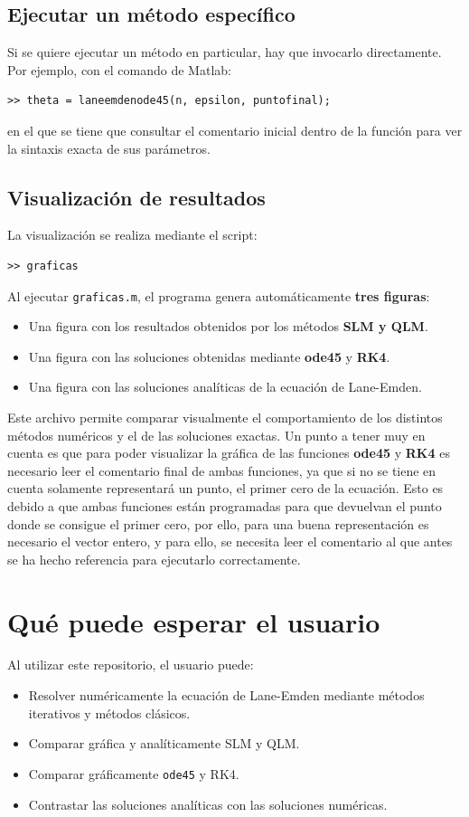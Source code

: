 \documentclass{article}
\begin{document}
\subsection{Ejecutar un método específico}

Si se quiere ejecutar un método en particular, hay que invocarlo directamente. 
Por ejemplo, con el comando de Matlab:
\begin{verbatim}
>> theta = laneemdenode45(n, epsilon, puntofinal);
\end{verbatim}
en el que se tiene que consultar el comentario inicial 
dentro de la función para ver la sintaxis exacta de sus parámetros.

\subsection{Visualización de resultados}

La visualización se realiza mediante el script:
\begin{verbatim}
>> graficas
\end{verbatim}
Al ejecutar \texttt{graficas.m}, el programa genera automáticamente 
\textbf{tres figuras}:
\begin{itemize}
  \item Una figura con los resultados obtenidos por los métodos \textbf{SLM y QLM}.
  \item Una figura con las soluciones obtenidas mediante \textbf{ode45} y \textbf{RK4}.
  \item Una figura con las soluciones analíticas de la ecuación de Lane-Emden.
\end{itemize}
Este archivo permite comparar visualmente el comportamiento de los distintos 
métodos numéricos y el de las soluciones exactas.
Un punto a tener muy en cuenta es que para poder visualizar la gráfica
de las funciones \textbf{ode45} y \textbf{RK4} es necesario leer el
comentario final de ambas funciones, ya que si no se tiene en cuenta
solamente representará un punto, el primer cero de la ecuación. Esto
es debido a que ambas funciones están programadas para que devuelvan
el punto donde se consigue el primer cero, por ello, para una buena 
representación es necesario el vector entero, y para ello, se necesita 
leer el comentario al que antes se ha hecho referencia para ejecutarlo
correctamente.

\section{Qué puede esperar el usuario}

Al utilizar este repositorio, el usuario puede:
\begin{itemize}
  \item Resolver numéricamente la ecuación de Lane-Emden mediante 
  métodos iterativos y métodos clásicos.
  \item Comparar gráfica y analíticamente SLM y QLM.
  \item Comparar gráficamente \texttt{ode45} y RK4.
  \item Contrastar las soluciones analíticas con las soluciones numéricas.
\end{itemize}
\end{document}
